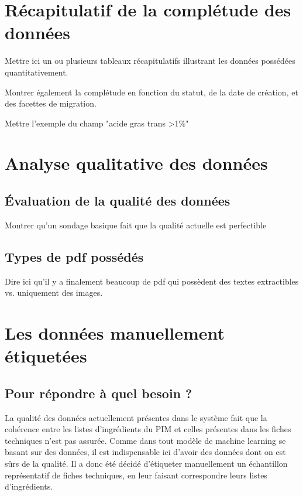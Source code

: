         \section{Récapitulatif de la complétude des données}

        Mettre ici un ou plusieurs tableaux récapitulatifs illustrant les données possédées quantitativement.

        Montrer également la complétude en fonction du statut, de la date de création, et des facettes de migration.

        Mettre l'exemple du champ "acide gras trans >1\%"

        \section{Analyse qualitative des données}
        
            \subsection{\'{E}valuation de la qualité des données}
        Montrer qu'un sondage basique fait que la qualité actuelle est perfectible


            \subsection{Types de pdf possédés}
        Dire ici qu'il y a finalement beaucoup de pdf qui possèdent des textes extractibles vs. uniquement des images.

        \section{Les données \og manuellement étiquetées \fg}
        \label{manually_labelled_data}

            \subsection{Pour répondre à quel besoin ?}

            La qualité des données actuellement présentes dans le système fait que la cohérence entre les listes d'ingrédients du PIM et celles présentes dans les fiches techniques n'est pas assurée.
            Comme dans tout modèle de machine learning se basant sur des données, il est indispensable ici d'avoir des données dont on est sûrs de la qualité.
            Il a donc été décidé d'étiqueter manuellement un échantillon représentatif de fiches techniques, en leur faisant correspondre leurs listes d'ingrédients.

